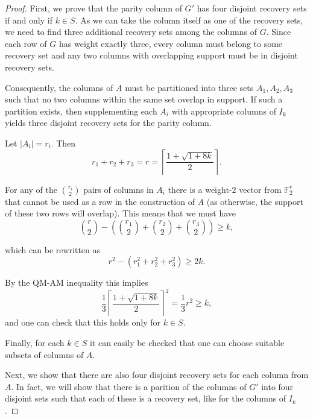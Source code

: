 \documentclass[11pt,a4paper]{article}
\theoremstyle{definition}
\newcommand{\F}{\mathbb{F}}
\begin{document}
\begin{proof}
    First, we prove that the parity column of $G'$ has four disjoint recovery sets if and only if $k \in S$. As we can take the column itself as one of the recovery sets, we need to find three additional recovery sets among the columns of $G$. Since each row of $G$ has weight exactly three, every column must belong to some recovery set and any two columns with overlapping support must be in disjoint recovery sets. 
    
    Consequently, the columns of $A$ must be partitioned into three sets $A_1, A_2, A_3$ such that no two columns within the same set overlap in support. If such a partition exists, then supplementing each $A_i$ with appropriate columns of $I_k$ yields three disjoint recovery sets for the parity column.
    
    Let $|A_i| = r_i$. Then
    $$
        r_1 + r_2 + r_3 = r = \left\lceil \frac{1 + \sqrt{1 + 8k}}{2}\right\rceil.
    $$
    
    For any of the $\binom{r_i}{2}$ pairs of columns in $A_i$ there is a weight-$2$ vector from $\F_2^r$ that cannot be used as a row in the construction of $A$ (as otherwise, the support of these two rows will overlap). This means that we must have 
    $$
        \binom{r}{2} - \left( \binom{r_1}{2} + \binom{r_2}{2} + \binom{r_3}{2}\right) \geq k,
    $$

    which can be rewritten as 
    $$
       r^2 - (r_1^2 + r_2^2 + r_3^2) \geq 2k.
    $$

    By the QM-AM inequality this implies 
    $$
        \frac{1}{3} \left\lceil \frac{1 + \sqrt{1 + 8k}}{2}\right\rceil^2 = \frac{1}{3}r^2 \geq k,
    $$
    and one can check that this holds only for $k \in S$. 

    Finally, for each $k \in S$ it can easily be checked that one can choose suitable subsets of columns of $A$.

    Next, we show that there are also four disjoint recovery sets for each column from $A$. In fact, we will show that there is a parition of the columns of $G'$ into four disjoint sets such that each of these is a recovery set, like for the columns of $I_k$. 


\end{proof}
\end{document}
